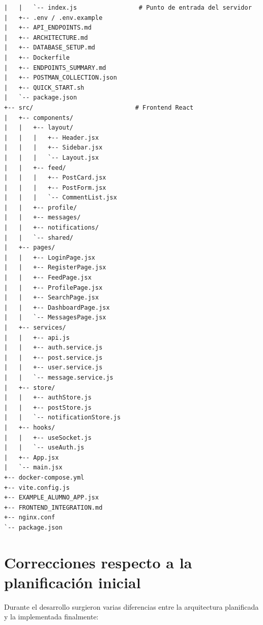 \documentclass[a4paper]{report}
\begin{document}
\begin{verbatim}
|   |   `-- index.js                 # Punto de entrada del servidor
|   +-- .env / .env.example
|   +-- API_ENDPOINTS.md
|   +-- ARCHITECTURE.md
|   +-- DATABASE_SETUP.md
|   +-- Dockerfile
|   +-- ENDPOINTS_SUMMARY.md
|   +-- POSTMAN_COLLECTION.json
|   +-- QUICK_START.sh
|   `-- package.json
+-- src/                            # Frontend React
|   +-- components/
|   |   +-- layout/
|   |   |   +-- Header.jsx
|   |   |   +-- Sidebar.jsx
|   |   |   `-- Layout.jsx
|   |   +-- feed/
|   |   |   +-- PostCard.jsx
|   |   |   +-- PostForm.jsx
|   |   |   `-- CommentList.jsx
|   |   +-- profile/
|   |   +-- messages/
|   |   +-- notifications/
|   |   `-- shared/
|   +-- pages/
|   |   +-- LoginPage.jsx
|   |   +-- RegisterPage.jsx
|   |   +-- FeedPage.jsx
|   |   +-- ProfilePage.jsx
|   |   +-- SearchPage.jsx
|   |   +-- DashboardPage.jsx
|   |   `-- MessagesPage.jsx
|   +-- services/
|   |   +-- api.js
|   |   +-- auth.service.js
|   |   +-- post.service.js
|   |   +-- user.service.js
|   |   `-- message.service.js
|   +-- store/
|   |   +-- authStore.js
|   |   +-- postStore.js
|   |   `-- notificationStore.js
|   +-- hooks/
|   |   +-- useSocket.js
|   |   `-- useAuth.js
|   +-- App.jsx
|   `-- main.jsx
+-- docker-compose.yml
+-- vite.config.js
+-- EXAMPLE_ALUMNO_APP.jsx
+-- FRONTEND_INTEGRATION.md
+-- nginx.conf
`-- package.json
\end{verbatim}

\section{Correcciones respecto a la planificación inicial}

Durante el desarrollo surgieron varias diferencias entre la arquitectura planificada y la implementada finalmente:
\end{document}
